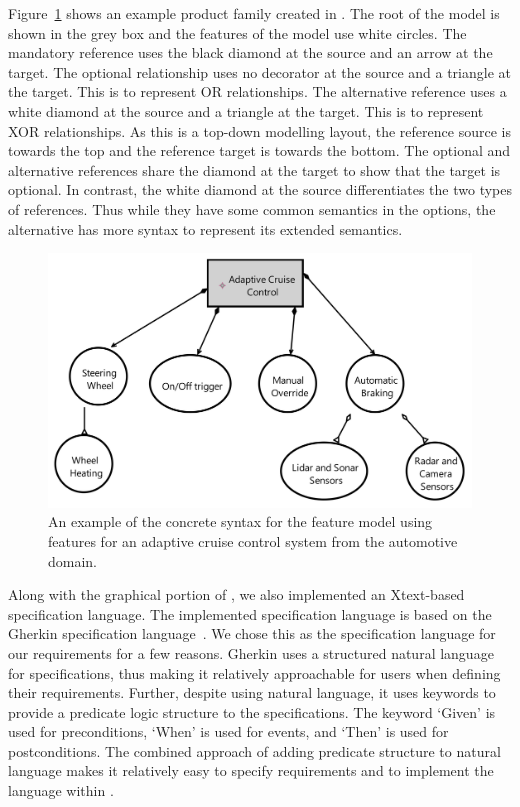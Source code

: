 Figure~\ref{fig:concrete_syntax_feat_mod} shows an example product family created in \tool. The root of the model is shown in the grey box and the features of the model use white circles. The mandatory reference uses the black diamond at the source and an arrow at the target. The optional relationship uses no decorator at the source and a triangle at the target. This is to represent OR relationships. The alternative reference uses a white diamond at the source and a triangle at the target. This is to represent XOR relationships. As this is a top-down modelling layout, the reference source is towards the top and the reference target is towards the bottom. The optional and alternative references share the diamond at the target to show that the target is optional. In contrast, the white diamond at the source differentiates the two types of references. Thus while they have some common semantics in the options, the alternative has more syntax to represent its extended semantics.

\begin{figure}[hbt!]
	\centering
	\includegraphics[width=\columnwidth]{Figures/FeatureModel_acc.jpg}
	\caption{An example of the concrete syntax for the feature model using features for an adaptive cruise control system from the automotive domain.}
	\label{fig:concrete_syntax_feat_mod}
\end{figure}

Along with the graphical portion of \tool, we also implemented an Xtext-based~\cite{eysholdt2010xtext} specification language. The implemented specification language is based on the Gherkin specification language~\cite{nicieja2017writing, cucumberdocs}. We chose this as the specification language for our requirements for a few reasons. Gherkin uses a structured natural language for specifications, thus making it relatively approachable for users when defining their requirements. Further, despite using natural language, it uses keywords to provide a predicate logic structure to the specifications. The keyword `Given' is used for preconditions, `When' is used for events, and `Then' is used for postconditions. The combined approach of adding predicate structure to natural language makes it relatively easy to specify requirements and to implement the language within \tool. 

